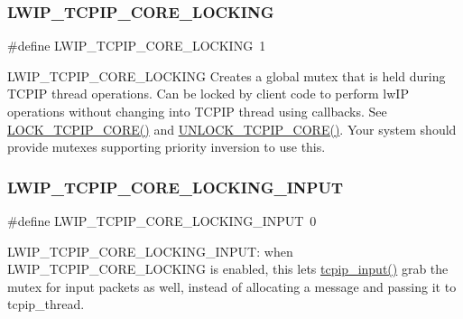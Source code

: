 \subsubsection{\texorpdfstring{L\+W\+I\+P\+\_\+\+T\+C\+P\+I\+P\+\_\+\+C\+O\+R\+E\+\_\+\+L\+O\+C\+K\+I\+NG}{LWIP\_TCPIP\_CORE\_LOCKING}\hspace{0.1cm}{\footnotesize\ttfamily [2/2]}}
{\footnotesize\ttfamily \#define L\+W\+I\+P\+\_\+\+T\+C\+P\+I\+P\+\_\+\+C\+O\+R\+E\+\_\+\+L\+O\+C\+K\+I\+NG~1}

L\+W\+I\+P\+\_\+\+T\+C\+P\+I\+P\+\_\+\+C\+O\+R\+E\+\_\+\+L\+O\+C\+K\+I\+NG Creates a global mutex that is held during T\+C\+P\+IP thread operations. Can be locked by client code to perform lw\+IP operations without changing into T\+C\+P\+IP thread using callbacks. See \hyperlink{native_2lwip_2src_2include_2lwip_2tcpip_8h_a4700525e737fc025fea4887b172e0c95}{L\+O\+C\+K\+\_\+\+T\+C\+P\+I\+P\+\_\+\+C\+O\+R\+E()} and \hyperlink{native_2lwip_2src_2include_2lwip_2tcpip_8h_a915effea029b9c4891e1ec635eb1826d}{U\+N\+L\+O\+C\+K\+\_\+\+T\+C\+P\+I\+P\+\_\+\+C\+O\+R\+E()}. Your system should provide mutexes supporting priority inversion to use this. \mbox{\label{group__lwip__opts__lock_ga351beb1c06affe49e717bc9f76c66acf}} 
\subsubsection{\texorpdfstring{L\+W\+I\+P\+\_\+\+T\+C\+P\+I\+P\+\_\+\+C\+O\+R\+E\+\_\+\+L\+O\+C\+K\+I\+N\+G\+\_\+\+I\+N\+P\+UT}{LWIP\_TCPIP\_CORE\_LOCKING\_INPUT}\hspace{0.1cm}{\footnotesize\ttfamily [1/2]}}
{\footnotesize\ttfamily \#define L\+W\+I\+P\+\_\+\+T\+C\+P\+I\+P\+\_\+\+C\+O\+R\+E\+\_\+\+L\+O\+C\+K\+I\+N\+G\+\_\+\+I\+N\+P\+UT~0}

L\+W\+I\+P\+\_\+\+T\+C\+P\+I\+P\+\_\+\+C\+O\+R\+E\+\_\+\+L\+O\+C\+K\+I\+N\+G\+\_\+\+I\+N\+P\+UT\+: when L\+W\+I\+P\+\_\+\+T\+C\+P\+I\+P\+\_\+\+C\+O\+R\+E\+\_\+\+L\+O\+C\+K\+I\+NG is enabled, this lets \hyperlink{group__lwip__os_gae510f195171bed8499ae94e264a92717}{tcpip\+\_\+input()} grab the mutex for input packets as well, instead of allocating a message and passing it to tcpip\+\_\+thread.

